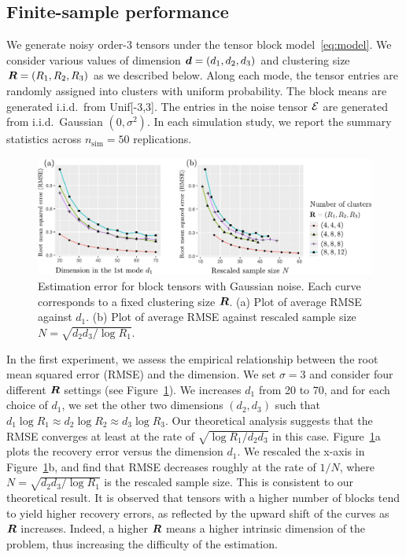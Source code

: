 \documentclass{article}
\begin{document}

\subsection{Finite-sample performance}

We generate noisy order-3 tensors under the tensor block model~\eqref{eq:model}. We consider various values of dimension $\bm{d}=(d_1,d_2,d_3)$ and clustering size $\bm{R}=(R_1,R_2,R_3)$ as we described below. Along each mode, the tensor entries are randomly assigned into clusters with uniform probability. The block means are generated i.i.d.\ from Unif[-3,3]. The entries in the noise tensor $\mathcal{E}$ are generated from i.i.d.\ Gaussian $(0,\sigma^2)$. In each simulation study, we report the summary statistics across $n_{\text{sim}}=50$ replications. 

\begin{figure}[http]
\centering
\includegraphics[width=.8\textwidth]{figures/figure3/decay.pdf}
\caption{Estimation error for block tensors with Gaussian noise. Each curve corresponds to a fixed clustering size $\bm{R}$. (a) Plot of average RMSE against $d_1$. (b) Plot of average RMSE against rescaled sample size $N=\sqrt{d_2d_3/\log R_1}$. 
}\label{fig:RMSE}
\end{figure}

In the first experiment, we assess the empirical relationship between the root mean squared error (RMSE) and the dimension. We set $\sigma=3$ and consider four different $\bm{R}$ settings (see Figure~\ref{fig:RMSE}). We increases $d_1$ from 20 to 70, and for each choice of $d_1$, we set the other two dimensions $(d_2,d_3)$ such that $d_1\log R_1\approx d_2\log R_2\approx d_3\log R_3$. Our theoretical analysis suggests that the RMSE converges at least at the rate of $\sqrt{\log R_1/d_2d_3}$ in this case. Figure~\ref{fig:RMSE}a plots the recovery error versus the dimension $d_1$. We rescaled the x-axis in Figure~\ref{fig:RMSE}b, and find that RMSE decreases roughly at the rate of $1/N$, where $N=\sqrt{d_2d_3/\log R_1}$ is the rescaled sample size. This is consistent to our theoretical result. It is observed that tensors with a higher number of blocks tend to yield higher recovery errors, as reflected by the upward shift of the curves as $\bm{R}$ increases. Indeed, a higher $\bm{R}$ means a higher intrinsic dimension of the problem, thus increasing the difficulty of the estimation. 
\end{document}
